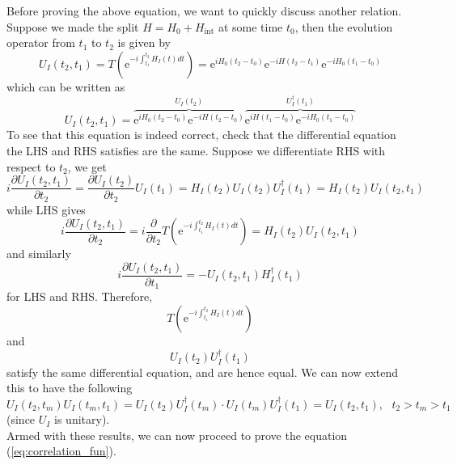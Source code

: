 \documentclass[11pt]{article}
\newcommand{\del}{\partial}
\newcommand{\e}{\mathrm{e}}
\numberwithin{equation}{section}
\begin{document}
Before proving the above equation, we want to quickly discuss another relation. Suppose we made the split \(H = H_0 + H_{\text{int}}\) at some time \(t_0\), then the evolution operator from \(t_1\) to \(t_2\) is given by 
\begin{equation*}
    U_I(t_2, t_1) = T\left( \e^{-i\int_{t_1}^{t_2}H_I(t)dt} \right) = \e^{iH_0(t_2 - t_0)} \e^{-iH(t_2 - t_1)} \e^{-iH_0(t_1-t_0)}
\end{equation*}
which can be written as 
\begin{equation*}
    U_I(t_2, t_1) = \overbrace{\e^{iH_0(t_2 - t_0)} \e^{-iH(t_2 - t_0)}}^{U_I(t_2)}  \overbrace{\e^{iH(t_1 - t_0)}\e^{-iH_0(t_1-t_0)}}^{U^\dagger_I(t_1)}
\end{equation*}
To see that this equation is indeed correct, check that the differential equation the LHS and RHS satisfies are the same. Suppose we differentiate RHS with respect to \(t_2\), we get 
\begin{equation*}
    i\frac{\del U_I(t_2, t_1)}{\del t_2} = \frac{\del U_I(t_2)}{\del t_2} U_I(t_1) = H_I(t_2) U_I(t_2)U^\dagger_I(t_1) = H_I(t_2) U_I(t_2, t_1) 
\end{equation*}
while LHS gives 
\begin{equation*}
    i\frac{\del U_I(t_2, t_1)}{\del t_2} = i\frac{\del}{\del t_2} T\left( \e^{-i\int_{t_1}^{t_2}H_I(t)dt} \right) = H_I(t_2) U_I(t_2, t_1)
\end{equation*}
and similarly 
\begin{equation*}
    i\frac{\del U_I(t_2, t_1)}{\del t_1} = - U_I(t_2, t_1)H_I^\dagger(t_1)
\end{equation*}
for LHS and RHS. Therefore, 
\begin{equation*}
    T\left( \e^{-i\int_{t_1}^{t_2}H_I(t)dt} \right)
\end{equation*}
and 
\begin{equation*}
    U_I(t_2) U^\dagger_I(t_1)
\end{equation*}
satisfy the same differential equation, and are hence equal. We can now extend this to have the following 
\begin{equation*}
    U_I(t_2, t_m)U_I(t_m, t_1) = U_I(t_2)U_I^\dagger(t_m)\cdot U_I(t_m)U_I^\dagger(t_1) = U_I(t_2, t_1),~~~t_2>t_m>t_1
\end{equation*}
(since \(U_I\) is unitary).\\

Armed with these results, we can now proceed to prove the equation (\ref{eq:correlation_fun}).
\end{document}
